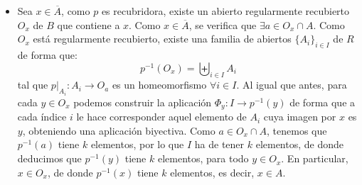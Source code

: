 \begin{ejercicio}
\begin{itemize}
        \item Sea $x\in \overline{A}$, como $p$ es recubridora, existe un abierto regularmente recubierto $O_x$ de $B$ que contiene a $x$. Como $x\in \overline{A}$, se verifica que $\exists a\in O_x\cap A$. Como $O_x$ está regularmente recubierto, existe una familia de abiertos $\{A_i\}_{i \in I}$ de $R$ de forma que:
            \begin{equation*}
                p^{-1}(O_x) = \biguplus_{i \in I}A_i
            \end{equation*}
            tal que $p\big|_{A_i}:A_i\to O_a$ es un homeomorfismo $\forall i \in I$. Al igual que antes, para cada $y \in O_x$ podemos construir la aplicación $\Phi_y:I\to p^{-1}(y)$ de forma que a cada índice $i$ le hace corresponder aquel elemento de $A_i$ cuya imagen por $x$ es $y$, obteniendo una aplicación biyectiva. Como $a\in O_x\cap A$, tenemos que $p^{-1}(a)$ tiene $k$ elementos, por lo que $I$ ha de tener $k$ elementos, de donde deducimos que $p^{-1}(y)$ tiene $k$ elementos, para todo $y \in O_x$. En particular, $x\in O_x$, de donde $p^{-1}(x)$ tiene $k$ elementos, es decir, $x\in A$.
    \end{itemize}
\end{ejercicio}

